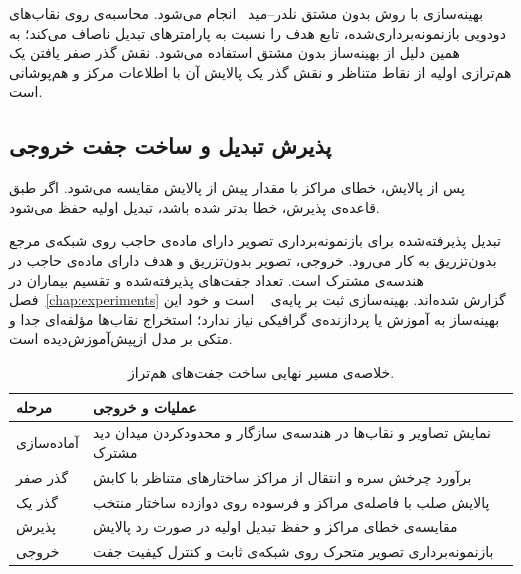 بهینه‌سازی با روش بدون مشتق نلدر–مید~\cite{nelder1965} انجام می‌شود. محاسبه‌ی  روی نقاب‌های دودویی بازنمونه‌برداری‌شده، تابع هدف را نسبت به پارامترهای تبدیل ناصاف می‌کند؛ به همین دلیل از بهینه‌ساز بدون مشتق استفاده می‌شود. نقش گذر صفر یافتن یک هم‌ترازی اولیه از نقاط متناظر و نقش گذر یک پالایش آن با اطلاعات مرکز و هم‌پوشانی است.

\subsection{پذیرش تبدیل و ساخت جفت خروجی}

پس از پالایش، خطای مراکز با مقدار پیش از پالایش مقایسه می‌شود. اگر طبق قاعده‌ی پذیرش، خطا بدتر شده باشد، تبدیل اولیه حفظ می‌شود.

تبدیل پذیرفته‌شده برای بازنمونه‌برداری تصویر دارای ماده‌ی حاجب روی شبکه‌ی مرجع بدون‌تزریق به کار می‌رود. خروجی، تصویر بدون‌تزریق و هدف دارای ماده‌ی حاجب در هندسه‌ی مشترک است. تعداد جفت‌های پذیرفته‌شده و تقسیم بیماران در فصل~\ref{chap:experiments} گزارش شده‌اند. بهینه‌سازی ثبت بر پایه‌ی ~\cite{lowekamp2013} است و خود این بهینه‌ساز به آموزش یا پردازنده‌ی گرافیکی نیاز ندارد؛ استخراج نقاب‌ها مؤلفه‌ای جدا و متکی بر مدل ازپیش‌آموزش‌دیده است.

\begin{table}[htbp]
\centering
\small
\caption{خلاصه‌ی مسیر نهایی ساخت جفت‌های هم‌تراز.}
\label{tab:reg-stages}
\begin{tabular}{|R{3.0cm}|R{9.4cm}|}
\hline
مرحله & عملیات و خروجی \\
\hline
آماده‌سازی & نمایش تصاویر و نقاب‌ها در هندسه‌ی سازگار و محدودکردن میدان دید مشترک \\
\hline
گذر صفر & برآورد چرخش سره و انتقال از مراکز ساختارهای متناظر با کابش \\
\hline
گذر یک & پالایش صلب با فاصله‌ی مراکز و  فرسوده روی دوازده ساختار منتخب \\
\hline
پذیرش & مقایسه‌ی خطای مراکز و حفظ تبدیل اولیه در صورت رد پالایش \\
\hline
خروجی & بازنمونه‌برداری تصویر متحرک روی شبکه‌ی ثابت و کنترل کیفیت جفت \\
\hline
\end{tabular}
\end{table}

